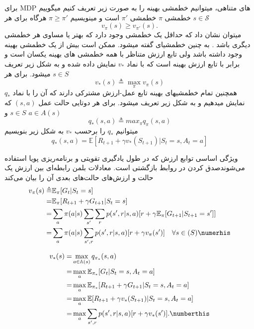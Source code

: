 برای MDP های متناهی، می\nf توانیم خط\nf مشی بهینه را به صورت زیر تعریف کنیم
می\nf گوییم خط\nf مشی $\pi$  خط\nf مشی 
$\pi'$
است و می\nf نویسیم 
$\pi \ge \pi'$
هرگاه برای هر 
$s \in \mathcal{S}$
$$v_\pi(s) \ge v_{\pi'}(s).$$
 می\nf توان نشان داد که حداقل یک خط\nf مشی وجود دارد که بهتر یا مساوی هر خط\nf مشی دیگری باشد
\cite{suttonbook}
. به چنین خط\nf مشی\nf ای  گفته می\nf شود. ممکن است بیش از یک خط\nf مشی بهینه وجود داشته باشد ولی تابع ارزش متناظر با همه خط\nf مشی \nf های بهینه یکسان است و برابر با تابع ارزش بهینه است که با نماد $v_*$ نمایش داده شده و به شکل زیر تعریف می\nf شود. برای هر $s \in S$
$$v_*(s) \triangleq \max_{\pi} v_\pi(s)$$
همچنین تمام خط\nf مشی\nf های بهینه تابع عمل-ارزش مشترکی دارند که آن را با نماد $q_*$ نمایش می\nf دهیم و به شکل زیر تعریف می\nf شود. برای هر دوتایی حالت عمل $(s,a)$ که $s \in S$ و $a \in A(s)$
$$q_*(s,a) \triangleq max_{\pi} q_\pi(s,a)$$
می\nf توانیم $q_*$ را برحسب $v_*$ به شکل زیر بنویسیم
\begin{equation}
q_* (s,a) = \mathbb{E}[R_{t+1} + \gamma v_*(S_{t+1})| S_t=s, A_t=a]
\end{equation}

ویژگی اساسی توابع ارزش که در طول یادگیری تقویتی و برنامه‌ریزی پویا استفاده می‌شوندصدق کردن در روابط بازگشتی است. معادلات بلمن رابطه‌ای بین ارزش یک حالت و ارزش‌های حالت‌های بعدی آن را بیان می‌کند
\begin{align}
v_\pi (s) \triangleq& \mathbb{E}_\pi [G_t | S_t = s] \nonumber \\
=& \mathbb{E}_\pi [R_{t+1}+ \gamma G_{t+1}|S_t=s] \nonumber \\
=&\sum_{a} \pi(a|s) \sum_{s'}\sum_{r} p(s',r|s,a)[r+\gamma \mathbb{E}_\pi[G_{t+1}|S_{t+1}=s']] \nonumber\\
=&\sum_{a} \pi(a|s) \sum_{s',r} p(s',r|s,a)[r+\gamma v_\pi(s')] \quad \forall s \in \mathbb(S) \numerhis 
\label{bellman}
\end{align}

\begin{align}
  v_{*}(s)= &\max_{a \in \mathbb{A}(s)} q_{\pi_*}(s,a) \nonumber \\
      =& \max_{a} \mathbb{E}_{\pi_*} [G_t|S_t=s, A_t=a] \nonumber \\ 
      =& \max_{a} \mathbb{E}_{\pi_*} [R_{t+1} + \gamma G_{t+1} | S_t=s, A_t=a] \nonumber \\ 
      =& \max_{a} \mathbb{E} [R_{t+1} + \gamma v_*(S_{t+1}) | S_t= s, A_t = a] \nonumber \\
      =& \max_{a} \sum_{s',r} p(s',r|s,a) [r + \gamma v_*(s')]. \numberthis
\label{eq:bellman-opti}
\end{align}




